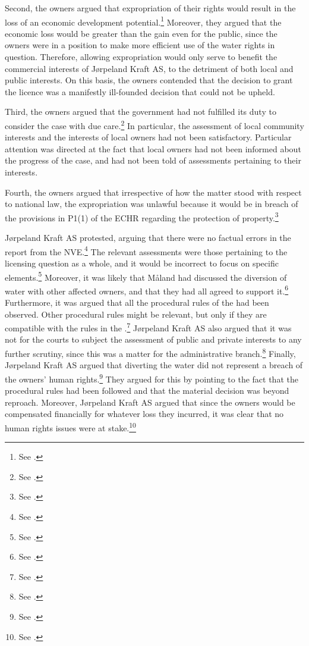 Second, the owners argued that expropriation of their rights would result in the loss of an economic development potential.\footnote{See \cite[5]{jorpeland11a}.} Moreover, they argued that the economic loss would be greater than the gain even for the public, since the owners were in a position to make more efficient use of the water rights in question. Therefore, allowing expropriation would only serve to benefit the commercial interests of Jørpeland Kraft AS, to the detriment of both local and public interests. On this basis, the owners contended that the decision to grant the licence was a manifestly ill-founded decision that could not be upheld.

Third, the owners argued that the government had not fulfilled its duty to consider the case with due care.\footnote{See \cite[12]{jorpeland09}.} In particular, the assessment of local community interests and the interests of local owners had not been satisfactory. Particular attention was directed at the fact that local owners had not been informed about the progress of the case, and had not been told of assessments pertaining to their interests.

Fourth, the owners argued that irrespective of how the matter stood with respect to national law, the expropriation was unlawful because it would be in breach of the provisions in P1(1) of the ECHR regarding the protection of property.\footnote{See \cite[07-08]{jorpeland09}.}

Jørpeland Kraft AS protested, arguing that there were no factual errors in the report from the NVE.\footnote{See \cite[16]{jorpeland11}.} The relevant assessments were those pertaining to the licensing question as a whole, and it would be incorrect to focus on specific elements.\footnote{See \cite[2]{jorpeland11a)}.} Moreover, it was likely that Måland had discussed the diversion of water with other affected owners, and that they had all agreed to support it.\footnote{See \cite[2]{jorpeland11a}.} Furthermore, it was argued that all the procedural rules of the \cite{wra17} had been observed. Other procedural rules might be relevant, but only if they are compatible with the rules in the \cite{wra17}.\footnote{See \cite[16]{jorpeland11}.} Jørpeland Kraft AS also argued that it was not for the courts to subject the assessment of public and private interests to any further scrutiny, since this was a matter for the administrative branch.\footnote{See \cite[2]{jorpeland11a}.} Finally, Jørpeland Kraft AS argued that diverting the water did not represent a breach of the owners' human rights.\footnote{See \cite[2]{jorpeland11a}.} They argued for this by pointing to the fact that the procedural rules had been followed and that the material decision was beyond reproach. Moreover, Jørpeland Kraft AS argued that since the owners would be compensated financially for whatever loss they incurred, it was clear that no human rights issues were at stake.\footnote{See \cite[2]{jorpeland11a}.}

